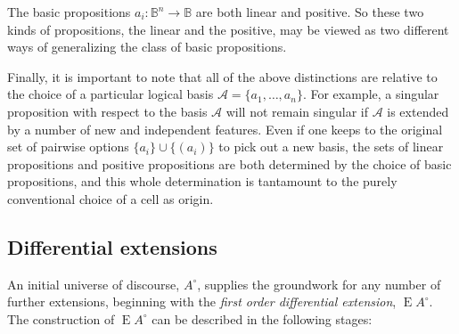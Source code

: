 \documentclass[12pt]{article}
\begin{document}
The basic propositions $a_i : \mathbb{B}^n \to \mathbb{B}$ are both linear and positive.  So these two kinds of propositions, the linear and the positive, may be viewed as two different ways of generalizing the class of basic propositions.

Finally, it is important to note that all of the above distinctions are relative to the choice of a particular logical basis $\mathcal{A} = \{ a_1, \ldots, a_n \}.$  For example, a singular proposition with respect to the basis $\mathcal{A}$ will not remain singular if $\mathcal{A}$ is extended by a number of new and independent features.  Even if one keeps to the original set of pairwise options $\{ a_i \} \cup \{ (a_i) \}$ to pick out a new basis, the sets of linear propositions and positive propositions are both determined by the choice of basic propositions, and this whole determination is tantamount to the purely conventional choice of a cell as origin.

\subsection{Differential extensions}

An initial universe of discourse, $A^\circ$, supplies the groundwork for any number of further extensions, beginning with the \textit{first order differential extension}, $\operatorname{E}A^\circ.$  The construction of $\operatorname{E}A^\circ$ can be described in the following stages:
\end{document}

